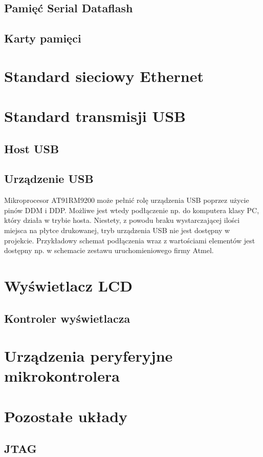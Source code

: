 \documentclass[a4paper,12pt]{book}
\begin{document}
			\subsection{Pamięć Serial Dataflash}
			\subsection{Karty pamięci}
		\section{Standard sieciowy Ethernet}
		\section{Standard transmisji USB}
			\subsection{Host USB}
			
			\subsection{Urządzenie USB}Mikroprocesor AT91RM9200 może pełnić rolę urządzenia USB poprzez użycie pinów DDM i DDP. Możliwe jest wtedy podłączenie np. do komputera klasy PC, który działa w trybie hosta. Niestety, z powodu braku wystarczającej ilości miejsca na płytce drukowanej, tryb urządzenia USB nie jest dostępny w projekcie. Przykładowy schemat podłączenia wraz z wartościami elementów jest dostępny np. w schemacie zestawu uruchomieniowego firmy Atmel\cite{at91rm9200_ek}.
			
		\section{Wyświetlacz LCD}
			\subsection{Kontroler wyświetlacza}
		\section{Urządzenia peryferyjne mikrokontrolera}
		\section{Pozostałe układy}
			\subsection{JTAG}
				\label{sec:jtag}
\end{document}
